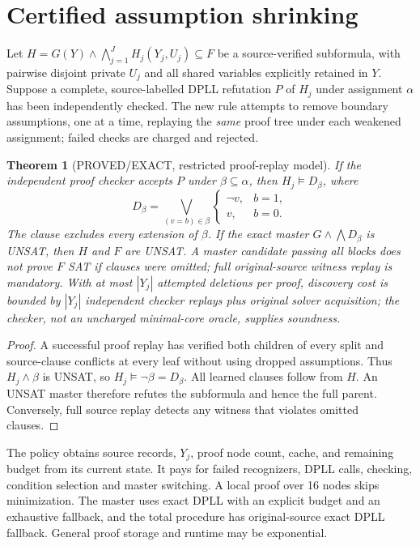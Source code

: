 \documentclass[11pt]{article}
\newtheorem{theorem}{Theorem}
\begin{document}
\section{Certified assumption shrinking}
Let $H=G(Y)\wedge\bigwedge_{j=1}^J H_j(Y_j,U_j)\subseteq F$ be a source-verified subformula, with pairwise disjoint private $U_j$ and all shared variables explicitly retained in $Y$. Suppose a complete, source-labelled DPLL refutation $P$ of $H_j$ under assignment $\alpha$ has been independently checked. The new rule attempts to remove boundary assumptions, one at a time, replaying the \emph{same} proof tree under each weakened assignment; failed checks are charged and rejected.
\begin{theorem}[PROVED/EXACT, restricted proof-replay model]
If the independent proof checker accepts $P$ under $\beta\subseteq\alpha$, then $H_j\models D_\beta$, where
\[
D_\beta=\bigvee_{(v=b)\in\beta}\begin{cases}\neg v,&b=1,\\v,&b=0.\end{cases}
\]
The clause excludes every extension of $\beta$. If the exact master $G\wedge\bigwedge D_\beta$ is UNSAT, then $H$ and $F$ are UNSAT. A master candidate passing all blocks does not prove $F$ SAT if clauses were omitted; full original-source witness replay is mandatory. With at most $|Y_j|$ attempted deletions per proof, discovery cost is bounded by $|Y_j|$ independent checker replays plus original solver acquisition; the checker, not an uncharged minimal-core oracle, supplies soundness.
\end{theorem}
\begin{proof}
A successful proof replay has verified both children of every split and source-clause conflicts at every leaf without using dropped assumptions. Thus $H_j\wedge\beta$ is UNSAT, so $H_j\models\neg\beta=D_\beta$. All learned clauses follow from $H$. An UNSAT master therefore refutes the subformula and hence the full parent. Conversely, full source replay detects any witness that violates omitted clauses.
\end{proof}
The policy obtains source records, $Y_j$, proof node count, cache, and remaining budget from its current state. It pays for failed recognizers, DPLL calls, checking, condition selection and master switching. A local proof over 16 nodes skips minimization. The master uses exact DPLL with an explicit budget and an exhaustive fallback, and the total procedure has original-source exact DPLL fallback. General proof storage and runtime may be exponential.
\end{document}
